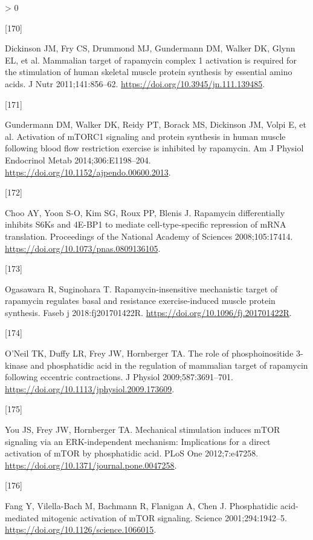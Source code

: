 \documentclass[twoside,10pt]{gihclass} %
\newlength{\cslhangindent}
\newlength{\csllabelwidth}
\newenvironment{CSLReferences}[3] %
 {%
  \setlength{\parindent}{0pt}
  \ifodd #1 \everypar{\setlength{\hangindent}{\cslhangindent}}\ignorespaces\fi
  \ifnum #2 > 0
  \setlength{\parskip}{#2\baselineskip}
  \fi
 }%
 {}
\newcommand{\CSLLeftMargin}[1]{\parbox[t]{\maxof{\widthof{#1}}{\csllabelwidth}}{#1}}
\newcommand{\CSLRightInline}[1]{\parbox[t]{\linewidth}{#1}}
\begin{document}
\begin{CSLReferences}{0}{0}
\leavevmode\hypertarget{ref-RN781}{}%
\CSLLeftMargin{{[}170{]} }
\CSLRightInline{Dickinson JM, Fry CS, Drummond MJ, Gundermann DM, Walker DK, Glynn EL, et al. Mammalian target of rapamycin complex 1 activation is required for the stimulation of human skeletal muscle protein synthesis by essential amino acids. J Nutr 2011;141:856--62. \url{https://doi.org/10.3945/jn.111.139485}.}

\leavevmode\hypertarget{ref-RN2826}{}%
\CSLLeftMargin{{[}171{]} }
\CSLRightInline{Gundermann DM, Walker DK, Reidy PT, Borack MS, Dickinson JM, Volpi E, et al. Activation of mTORC1 signaling and protein synthesis in human muscle following blood flow restriction exercise is inhibited by rapamycin. Am J Physiol Endocrinol Metab 2014;306:E1198--204. \url{https://doi.org/10.1152/ajpendo.00600.2013}.}

\leavevmode\hypertarget{ref-RN2839}{}%
\CSLLeftMargin{{[}172{]} }
\CSLRightInline{Choo AY, Yoon S-O, Kim SG, Roux PP, Blenis J. Rapamycin differentially inhibits S6Ks and 4E-BP1 to mediate cell-type-specific repression of mRNA translation. Proceedings of the National Academy of Sciences 2008;105:17414. \url{https://doi.org/10.1073/pnas.0809136105}.}

\leavevmode\hypertarget{ref-RN2836}{}%
\CSLLeftMargin{{[}173{]} }
\CSLRightInline{Ogasawara R, Suginohara T. Rapamycin-insensitive mechanistic target of rapamycin regulates basal and resistance exercise-induced muscle protein synthesis. Faseb j 2018:fj201701422R. \url{https://doi.org/10.1096/fj.201701422R}.}

\leavevmode\hypertarget{ref-RN2844}{}%
\CSLLeftMargin{{[}174{]} }
\CSLRightInline{O'Neil TK, Duffy LR, Frey JW, Hornberger TA. The role of phosphoinositide 3-kinase and phosphatidic acid in the regulation of mammalian target of rapamycin following eccentric contractions. J Physiol 2009;587:3691--701. \url{https://doi.org/10.1113/jphysiol.2009.173609}.}

\leavevmode\hypertarget{ref-RN2119}{}%
\CSLLeftMargin{{[}175{]} }
\CSLRightInline{You JS, Frey JW, Hornberger TA. Mechanical stimulation induces mTOR signaling via an ERK-independent mechanism: Implications for a direct activation of mTOR by phosphatidic acid. PLoS One 2012;7:e47258. \url{https://doi.org/10.1371/journal.pone.0047258}.}

\leavevmode\hypertarget{ref-RN2126}{}%
\CSLLeftMargin{{[}176{]} }
\CSLRightInline{Fang Y, Vilella-Bach M, Bachmann R, Flanigan A, Chen J. Phosphatidic acid-mediated mitogenic activation of mTOR signaling. Science 2001;294:1942--5. \url{https://doi.org/10.1126/science.1066015}.}


\end{CSLReferences}
\end{document}
